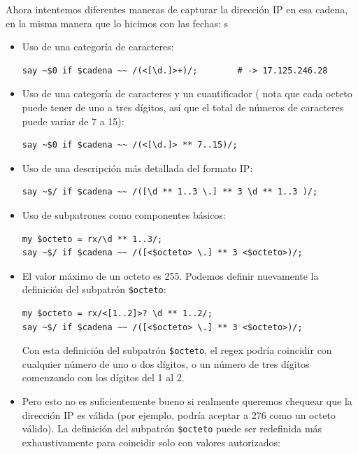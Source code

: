 Ahora intentemos diferentes maneras de capturar la dirección
IP en esa cadena, en la misma manera que lo hicimos con las 
fechas:
s
\begin{itemize}     

\item Uso de una categoría de caracteres:

\begin{lstlisting}
say ~$0 if $cadena ~~ /(<[\d.]>+)/;        # -> 17.125.246.28
\end{lstlisting}
%

\item Uso de una categoría de caracteres y un cuantificador (
nota que cada octeto puede tener de uno a tres dígitos, así que 
el total de números de caracteres puede variar de 7 a 15):

\begin{lstlisting}
say ~$0 if $cadena ~~ /(<[\d.]> ** 7..15)/;  
\end{lstlisting}
%

\item Uso de una descripción más detallada del formato IP:
\begin{lstlisting}
say ~$/ if $cadena ~~ /([\d ** 1..3 \.] ** 3 \d ** 1..3 )/;
\end{lstlisting}
%

\item Uso de subpatrones como componentes básicos:
\begin{lstlisting}
my $octeto = rx/\d ** 1..3/;
say ~$/ if $cadena ~~ /([<$octeto> \.] ** 3 <$octeto>)/;
\end{lstlisting}
%

\item El valor máximo de un octeto es 255. Podemos definir
nuevamente la definición del subpatrón \verb|$octeto|:
\begin{lstlisting}
my $octeto = rx/<[1..2]>? \d ** 1..2/;
say ~$/ if $cadena ~~ /([<$octeto> \.] ** 3 <$octeto>)/;
\end{lstlisting}
%
Con esta definición del subpatrón \verb|$octeto|,
el regex podría coincidir con cualquier número de uno 
o dos dígitos, o un número de tres dígitos comenzando con
los dígitos del 1 al 2.

\item Pero esto no es suficientemente bueno si realmente 
queremos chequear que la dirección IP es válida (por ejemplo,
podría aceptar a 276 como un octeto válido). La definición
del subpatrón \verb|$octeto| puede ser redefinida más
exhaustivamente para coincidir solo con valores
autorizados: 


\end{itemize}
